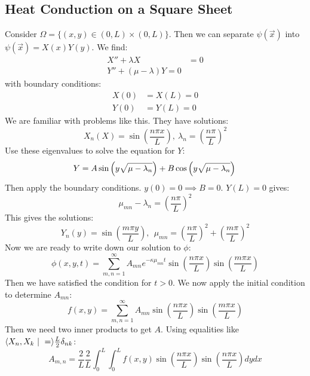 \documentclass[../Main.tex]{subfiles}
\begin{document}
\subsection{Heat Conduction on a Square Sheet}
Consider $\Omega = \{(x, y) \in (0, L) \times (0, L)\}$. Then we can separate $\psi(\vec{x})$ into $\psi(\vec{x}) = X(x)Y(y)$. We find:
\begin{align*}
    X'' + \lambda X &= 0 \\
    Y'' + (\mu - \lambda) Y = 0
\end{align*}
with boundary conditions:
\begin{align*}
    X(0) &= X(L) = 0 \\
    Y(0) &= Y(L) = 0
\end{align*}
We are familiar with problems like this. They have solutions:
\begin{equation*}
    X_n(X) = \sin\left(\frac{n \pi x}{L}\right),~\lambda_n = \left(\frac{n\pi}{L}\right)^2
\end{equation*}
Use these eigenvalues to solve the equation for $Y$:
\begin{equation*}
    Y = A\sin\left(y\sqrt{\mu - \lambda_n}\right) + B\cos\left(y\sqrt{\mu - \lambda_n}\right) \\
\end{equation*}
Then apply the boundary conditions. $y(0) = 0 \implies B = 0$. $Y(L) = 0$ gives:
\begin{equation*}
    \mu_{mn} - \lambda_n = \left(\frac{n\pi}{L}\right)^2
\end{equation*}
This gives the solutions:
\begin{equation*}
    Y_n(y) = \sin\left(\frac{m \pi y}{L}\right),~~\mu_{mn} = \left(\frac{n\pi}{L}\right)^2 + \left(\frac{m \pi}{L}\right)^2
\end{equation*}
Now we are ready to write down our solution to $\phi$:
\begin{equation*}
    \phi(x, y, t) = \sum_{m, n = 1}^{\infty} A_{mn} e^{-\kappa \mu_{mn}t} \sin\left(\frac{n \pi x}{L}\right)\sin\left(\frac{m \pi x}{L}\right)
\end{equation*}
Then we have satisfied the condition for $t > 0$. We now apply the initial condition to determine $A_{mn}$:
\begin{equation*}
    f(x, y) = \sum_{m, n = 1}^{\infty} A_{mn} \sin\left(\frac{n \pi x}{L}\right) \sin\left(\frac{m \pi x}{L}\right)
\end{equation*}
Then we need two inner products to get $A$. Using equalities like $\langle X_n, X_k~\vert~=\rangle \frac{L}{2} \delta_{nk}$:
\begin{equation*}
    A_{m, n} = \frac{2}{L} \frac{2}{L} \int_{0}^{L} \int_{0}^{L} f(x, y) \sin\left(\frac{n \pi x}{L}\right) \sin\left(\frac{n \pi x}{L}\right) dy  dx 
\end{equation*}
\end{document}
